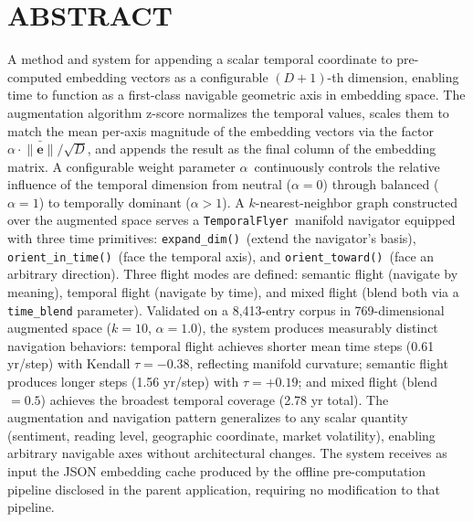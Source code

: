\documentclass[12pt,letterpaper]{article}
\newcommand{\temporalflyer}{\texttt{TemporalFlyer}}
\newcommand{\expanddim}{\texttt{expand\_dim()}}
\newcommand{\orientintime}{\texttt{orient\_in\_time()}}
\newcommand{\orienttoward}{\texttt{orient\_toward()}}
\newcommand{\alphabar}{$\alpha$}
\begin{document}
\section*{ABSTRACT}

A method and system for appending a scalar temporal coordinate to pre-computed
embedding vectors as a configurable $(D+1)$-th dimension, enabling time to
function as a first-class navigable geometric axis in embedding space. The
augmentation algorithm z-score normalizes the temporal values, scales them to
match the mean per-axis magnitude of the embedding vectors via the factor
$\alpha \cdot \bar{\|\mathbf{e}\|}/\sqrt{D}$, and appends the result as the
final column of the embedding matrix. A configurable weight parameter
\alphabar\ continuously controls the relative influence of the temporal
dimension from neutral ($\alpha = 0$) through balanced ($\alpha = 1$) to
temporally dominant ($\alpha > 1$). A $k$-nearest-neighbor graph constructed
over the augmented space serves a \temporalflyer\ manifold navigator equipped
with three time primitives: \expanddim\ (extend the navigator's basis),
\orientintime\ (face the temporal axis), and \orienttoward\ (face an arbitrary
direction). Three flight modes are defined: semantic flight (navigate by
meaning), temporal flight (navigate by time), and mixed flight (blend both via
a \texttt{time\_blend} parameter). Validated on a 8,413-entry corpus in
769-dimensional augmented space ($k=10$, $\alpha=1.0$), the system produces
measurably distinct navigation behaviors: temporal flight achieves shorter mean
time steps (0.61 yr/step) with Kendall $\tau = -0.38$, reflecting manifold
curvature; semantic flight produces longer steps (1.56 yr/step) with
$\tau = +0.19$; and mixed flight (blend~$= 0.5$) achieves the broadest
temporal coverage (2.78 yr total). The augmentation and navigation pattern
generalizes to any scalar quantity (sentiment, reading level, geographic
coordinate, market volatility), enabling arbitrary navigable axes without
architectural changes. The system receives as input the JSON embedding cache
produced by the offline pre-computation pipeline disclosed in the parent
application, requiring no modification to that pipeline.

\end{document}
